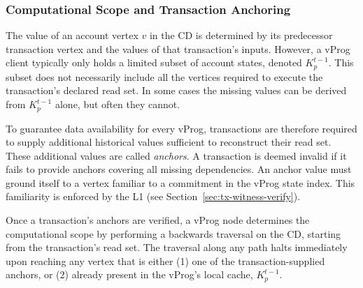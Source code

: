 \documentclass[onecolumn, 9pt, a4paper]{extarticle}
\begin{document}
\subsubsection{Computational Scope and Transaction Anchoring}
The value of an account vertex $v$ in the CD is determined by its predecessor transaction vertex and the values of that transaction’s inputs. However, a vProg client typically only holds a limited subset of account states, denoted $K_p^{t{-}1}$. This subset does not necessarily include all the vertices required to execute the transaction’s declared read set. In some cases the missing values can be derived from $K_p^{t{-}1}$ alone, but often they cannot. 

To guarantee data availability for every vProg, transactions are therefore required to supply additional historical values sufficient to reconstruct their read set. These additional values are called \emph{anchors}. A transaction is deemed invalid if it fails to provide anchors covering all missing dependencies. An anchor value must ground itself to a vertex familiar to a commitment in the vProg state index. This familiarity is enforced by the L1 (see Section~\ref{sec:tx-witness-verify}).



Once a transaction's anchors are verified, a vProg node determines the computational scope by performing a backwards traversal on the CD, starting from the transaction's read set. The traversal along any path halts immediately upon reaching any vertex that is either (1) one of the transaction-supplied anchors, or (2) already present in the vProg's local cache, $K_p^{t-1}$.
\end{document}
